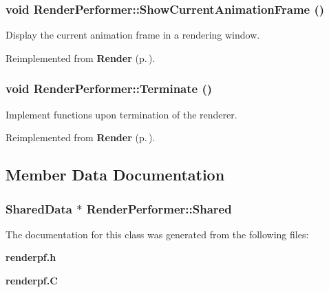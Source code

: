 \subsubsection{\setlength{\rightskip}{0pt plus 5cm}void Render\-Performer::Show\-Current\-Animation\-Frame ()\hspace{0.3cm}{\tt  [protected, virtual]}}\label{classRenderPerformer_b0}


Display the current animation frame in a rendering window.



Reimplemented from {\bf Render} {\rm (p.\,\pageref{classRender_b1})}.
\subsubsection{\setlength{\rightskip}{0pt plus 5cm}void Render\-Performer::Terminate ()\hspace{0.3cm}{\tt  [virtual]}}\label{classRenderPerformer_a6}


Implement functions upon termination of the renderer.



Reimplemented from {\bf Render} {\rm (p.\,\pageref{classRender_a8})}.

\subsection{Member Data Documentation}
\subsubsection{\setlength{\rightskip}{0pt plus 5cm}Shared\-Data $\ast$ Render\-Performer::Shared\hspace{0.3cm}{\tt  [static, protected]}}\label{classRenderPerformer_q0}




The documentation for this class was generated from the following files:\begin{CompactItemize}
\item 
{\bf renderpf.h}\item 
{\bf renderpf.C}\end{CompactItemize}
